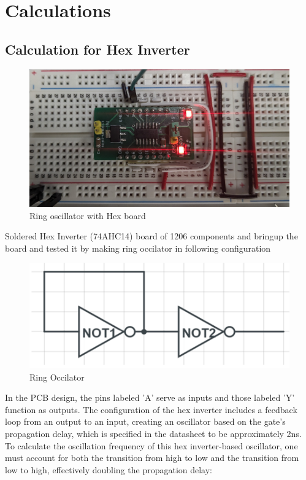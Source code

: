 \documentclass[a4paper,11pt]{article}%
\begin{document}
\section{Calculations}


\subsection{Calculation for Hex Inverter}

\begin{figure}[H]
	\centering
	\includegraphics[scale=0.2]{figures/hexboard.jpg}
	\caption{Ring oscillator with Hex board}
	\label{hexboard}
\end{figure}

Soldered Hex Inverter (74AHC14) board of 1206 components and bringup the board and tested it by making ring occilator in following configuration 

\begin{figure}[H]
	\centering
	\includegraphics[scale=0.6]{figures/ring.png}
	\caption{Ring Occilator}
	\label{ring}
\end{figure}

In the PCB design, the pins labeled 'A' serve as inputs and those labeled 'Y' function as outputs. The configuration of the hex inverter includes a feedback loop from an output to an input, creating an oscillator based on the gate's propagation delay, which is specified in the datasheet to be approximately 2ns. To calculate the oscillation frequency of this hex inverter-based oscillator, one must account for both the transition from high to low and the transition from low to high, effectively doubling the propagation delay:
\end{document}
